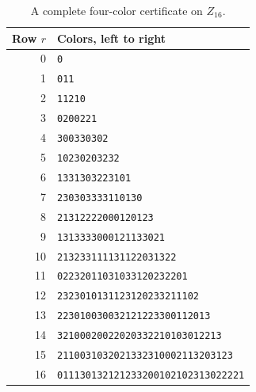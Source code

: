 \documentclass[11pt]{article}
\begin{document}
\begin{table}[ht]
\centering
\small
\begin{tabular}{r l}\toprule
Row $r$ & Colors, left to right \\\midrule
0 & \texttt{0} \\
1 & \texttt{011} \\
2 & \texttt{11210} \\
3 & \texttt{0200221} \\
4 & \texttt{300330302} \\
5 & \texttt{10230203232} \\
6 & \texttt{1331303223101} \\
7 & \texttt{230303333110130} \\
8 & \texttt{21312222000120123} \\
9 & \texttt{1313333000121133021} \\
10 & \texttt{213233111131122031322} \\
11 & \texttt{02232011031033120232201} \\
12 & \texttt{2323010131123120233211102} \\
13 & \texttt{223010030032121223300112013} \\
14 & \texttt{32100020022020332210103012213} \\
15 & \texttt{2110031032021332310002113203123} \\
16 & \texttt{011130132121233200102102313022221} \\
\bottomrule\end{tabular}
\caption{A complete four-color certificate on $Z_{16}$.}\label{tab:n4}
\end{table}
\end{document}
